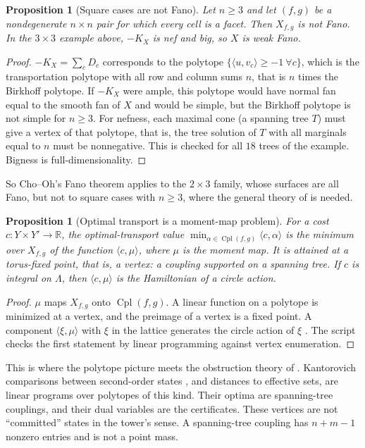 \documentclass[11pt]{article}
\newtheorem{proposition}[theorem]{Proposition}
\theoremstyle{definition}
\theoremstyle{remark}
\newcommand{\Cpl}{\operatorname{Cpl}}
\begin{document}
\begin{proposition}[Square cases are not Fano]\label{prop:notfano}
Let $n\ge3$ and let $(f,g)$ be a nondegenerate $n\times n$ pair for which every cell is a facet. Then
$X_{f,g}$ is not Fano. In the $3\times3$ example above, $-K_X$ is nef and big, so $X$ is weak Fano.
\end{proposition}
\begin{proof}
$-K_X=\sum_cD_c$ corresponds to the polytope $\{\langle u,v_c\rangle\ge-1\ \forall c\}$, which is the transportation
polytope with all row and column sums $n$, that is $n$ times the Birkhoff polytope. If $-K_X$ were ample,
this polytope would have normal fan equal to the smooth fan of $X$ and would be simple, but the Birkhoff
polytope is not simple for $n\ge3$. For nefness, each maximal cone (a spanning tree $T$) must give a vertex
of that polytope, that is, the tree solution of $T$ with all marginals equal to $n$ must be nonnegative.
This is checked for all $18$ trees of the example. Bigness is full-dimensionality.
\end{proof}

So Cho--Oh's Fano theorem applies to the $2\times3$ family, whose surfaces are all Fano, but not to square
cases with $n\ge3$, where the general theory of \cite{FOOO2010} is needed.

\begin{proposition}[Optimal transport is a moment-map problem]\label{prop:ot}
For a cost $c\colon Y\times Y'\to\mathbb{R}$, the optimal-transport value $\min_{\alpha\in\Cpl(f,g)}\langle c,\alpha\rangle$ is
the minimum over $X_{f,g}$ of the function $\langle c,\mu\rangle$, where $\mu$ is the moment map. It is attained at a
torus-fixed point, that is, a vertex: a coupling supported on a spanning tree. If $c$ is integral on
$\Lambda$, then $\langle c,\mu\rangle$ is the Hamiltonian of a circle action.
\end{proposition}
\begin{proof}
$\mu$ maps $X_{f,g}$ onto $\Cpl(f,g)$. A linear function on a polytope is minimized at a vertex, and the
preimage of a vertex is a fixed point. A component $\langle\xi,\mu\rangle$ with $\xi$ in the lattice generates the
circle action of $\xi$ \cite{Delzant1988}. The script checks the first statement by linear programming against
vertex enumeration.
\end{proof}

This is where the polytope picture meets the obstruction theory of \cite{Tower}. Kantorovich comparisons
between second-order states \cite[Prop.~9.14]{Tower}, and distances to effective sets, are linear programs
over polytopes of this kind. Their optima are spanning-tree couplings, and their dual variables are the
certificates. These vertices are not ``committed'' states in the tower's sense. A spanning-tree coupling
has $n+m-1$ nonzero entries and is not a point mass.
\end{document}
